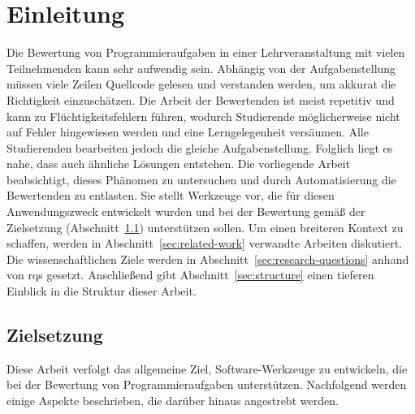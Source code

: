 \chapter{Einleitung}\label{ch:introduction}

Die Bewertung von Programmieraufgaben in einer Lehrveranstaltung mit vielen Teilnehmenden kann sehr aufwendig sein.
Abhängig von der Aufgabenstellung müssen viele Zeilen Quellcode gelesen und verstanden werden, um akkurat die Richtigkeit einzuschätzen.
Die Arbeit der Bewertenden ist meist repetitiv und kann zu Flüchtigkeitsfehlern führen, wodurch Studierende möglicherweise nicht auf Fehler hingewiesen werden und eine Lerngelegenheit versäumen.
Alle Studierenden bearbeiten jedoch die gleiche Aufgabenstellung.
Folglich liegt es nahe, dass auch ähnliche Lösungen entstehen.
Die vorliegende Arbeit beabsichtigt, dieses Phänomen zu untersuchen und durch Automatisierung die Bewertenden zu entlasten.
Sie stellt Werkzeuge vor, die für diesen Anwendungszweck entwickelt wurden und bei der Bewertung gemäß der Zielsetzung (Abschnitt~\ref{sec:goals}) unterstützen sollen.
Um einen breiteren Kontext zu schaffen, werden in Abschnitt~\ref{sec:related-work} verwandte Arbeiten diskutiert.
Die wissenschaftlichen Ziele werden in Abschnitt~\ref{sec:research-questions} anhand von \acp{rq} gesetzt.
Anschließend gibt Abschnitt~\ref{sec:structure} einen tieferen Einblick in die Struktur dieser Arbeit.

\section{Zielsetzung}\label{sec:goals}

Diese Arbeit verfolgt das allgemeine Ziel, Software-Werkzeuge zu entwickeln, die bei der Bewertung von Programmieraufgaben unterstützen.
Nachfolgend werden einige Aspekte beschrieben, die darüber hinaus angestrebt werden.

